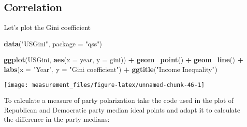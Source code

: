 \documentclass[]{book}
\newenvironment{Shaded}{\begin{snugshade}}{\end{snugshade}}
\newcommand{\KeywordTok}[1]{\textcolor[rgb]{0.13,0.29,0.53}{\textbf{#1}}}
\newcommand{\DataTypeTok}[1]{\textcolor[rgb]{0.13,0.29,0.53}{#1}}
\newcommand{\StringTok}[1]{\textcolor[rgb]{0.31,0.60,0.02}{#1}}
\newcommand{\OperatorTok}[1]{\textcolor[rgb]{0.81,0.36,0.00}{\textbf{#1}}}
\newcommand{\NormalTok}[1]{#1}
\theoremstyle{definition}
\theoremstyle{definition}
\theoremstyle{definition}
\theoremstyle{remark}
\begin{document}
\subsection{Correlation}\label{correlation}

Let's plot the Gini coefficient

\begin{Shaded}
\begin{Highlighting}[]
\KeywordTok{data}\NormalTok{(}\StringTok{"USGini"}\NormalTok{, }\DataTypeTok{package =} \StringTok{"qss"}\NormalTok{)}
\end{Highlighting}
\end{Shaded}

\begin{Shaded}
\begin{Highlighting}[]
\KeywordTok{ggplot}\NormalTok{(USGini, }\KeywordTok{aes}\NormalTok{(}\DataTypeTok{x =}\NormalTok{ year, }\DataTypeTok{y =}\NormalTok{ gini)) }\OperatorTok{+}
\StringTok{  }\KeywordTok{geom_point}\NormalTok{() }\OperatorTok{+}
\StringTok{  }\KeywordTok{geom_line}\NormalTok{() }\OperatorTok{+}
\StringTok{  }\KeywordTok{labs}\NormalTok{(}\DataTypeTok{x =} \StringTok{"Year"}\NormalTok{, }\DataTypeTok{y =} \StringTok{"Gini coefficient"}\NormalTok{) }\OperatorTok{+}
\StringTok{  }\KeywordTok{ggtitle}\NormalTok{(}\StringTok{"Income Inequality"}\NormalTok{)}
\end{Highlighting}
\end{Shaded}

\begin{center}\texttt{[image: measurement\_files/figure-latex/unnamed-chunk-46-1]} \end{center}

To calculate a measure of party polarization take the code used in the
plot of Republican and Democratic party median ideal points and adapt it
to calculate the difference in the party medians:
\end{document}
